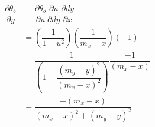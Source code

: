 \begin{align}
  \dfrac{\partial \theta_b}{\partial y}
  &= \dfrac{\partial \theta_b}{\partial u}
    \dfrac{\partial u}{\partial dy}
    \dfrac{\partial dy}{\partial x} \nonumber \\
  &= \left( \dfrac{1}{1 + u^2} \right)
    \left( \dfrac{1}{m_x - x} \right)
    \left( -1 \right) \nonumber \\
  &= \dfrac{1}{\left(1 + \dfrac{(m_y - y)^2}{(m_x - x)^2} \right)}
    \dfrac{-1}{(m_x - x)} \nonumber \\
  &= \dfrac{-(m_x - x)}{(m_x - x)^2 + (m_y - y)^2}
\end{align}
